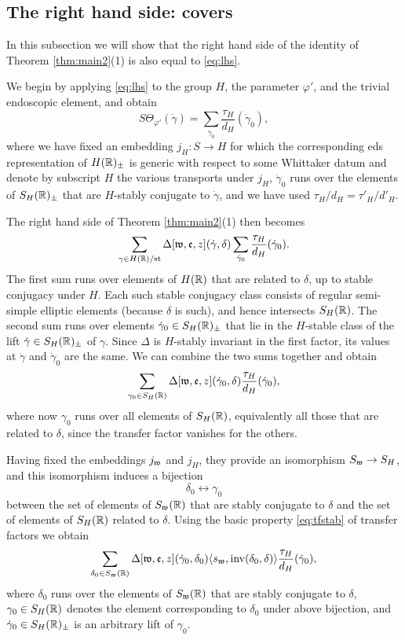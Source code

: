 \documentclass{article}
\theoremstyle{definition}
\numberwithin{equation}{section}
\renewcommand{\-}{\hyp{}}
\begin{document}
\subsection{The right hand side: covers} \label{sub:rhs_cover}

In this subsection we will show that the right hand side of the identity of Theorem \ref{thm:main2}(1) is also equal to \eqref{eq:lhs}.

We begin by applying \eqref{eq:lhs} to the group $H$, the parameter $\varphi'$, and the trivial endoscopic element, and obtain
\[ S\Theta_{\varphi'}(\dot\gamma) = \sum_{\dot\gamma_0} \frac{\tau_H}{d_{H}}(\dot\gamma_0), \]
where we have fixed an embedding $j_H : S \to H$ for which the corresponding eds representation of $H(\mathbb{R})_\pm$ is generic with respect to some Whittaker datum and denote by subscript $H$ the various transports under $j_H$, $\dot\gamma_0$ runs over the elements of $S_H(\mathbb{R})_\pm$ that are $H$-stably conjugate to $\dot\gamma$, and we have used $\tau_H/d_H=\tau'_H/d'_H$.

The right hand side of Theorem \ref{thm:main2}(1) then becomes
\[ \sum_{\gamma \in H(\mathbb{R})/\textrm{st}} \Delta[\mathfrak{w},\mathfrak{e},z](\dot\gamma,\delta)\sum_{\dot\gamma_0} \frac{\tau_H}{d_{H}}(\dot\gamma_0). \]
The first sum runs over elements of $H(\mathbb{R})$ that are related to $\delta$, up to stable conjugacy under $H$. Each such stable conjugacy class consists of regular semi-simple elliptic elements (because $\delta$ is such), and hence intersects $S_H(\mathbb{R})$. The second sum runs over elements $\dot\gamma_0 \in S_H(\mathbb{R})_\pm$ that lie in the $H$-stable class of the lift $\dot\gamma \in S_H(\mathbb{R})_\pm$ of $\gamma$. Since $\Delta$ is $H$-stably invariant in the first factor, its values at $\dot\gamma$ and $\dot\gamma_0$ are the same. We can combine the two sums together and obtain
\[ \sum_{\gamma_0 \in S_H(\mathbb{R})} \Delta[\mathfrak{w},\mathfrak{e},z](\dot\gamma_0,\delta) \frac{\tau_H}{d_{H}}(\dot\gamma_0), \]
where now $\gamma_0$ runs over all elements of $S_H(\mathbb{R})$, equivalently all those that are related to $\delta$, since the transfer factor vanishes for the others.


Having fixed the embeddings $j_{\mathfrak{w}}$ and $j_H$, they provide an isomorphism $S_{\mathfrak{w}} \to S_H$, and this isomorphism induces a bijection
\[ \delta_0 \leftrightarrow \gamma_0 \]
between the set of elements of $S_{\mathfrak{w}}(\mathbb{R})$ that are stably conjugate to $\delta$ and the set of elements of $S_H(\mathbb{R})$ related to $\delta$. Using the basic property \eqref{eq:tfstab} of transfer factors we obtain
\begin{equation} \label{eq:rhs1}
\sum_{\delta_0 \in S_{\mathfrak{w}}(\mathbb{R})} \Delta[\mathfrak{w},\mathfrak{e},z](\dot\gamma_0,\delta_0)\langle s_{\mathfrak{w}},\textrm{inv}(\delta_0,\delta)\rangle \frac{\tau_H}{d_{H}}(\dot\gamma_0),
\end{equation}
where $\delta_0$ runs over the elements of $S_{\mathfrak{w}}(\mathbb{R})$ that are stably conjugate to $\delta$, $\gamma_0 \in S_H(\mathbb{R})$ denotes the element corresponding to $\delta_0$ under above bijection, and $\dot\gamma_0 \in S_H(\mathbb{R})_\pm$ is an arbitrary lift of $\gamma_0$.
\end{document}
